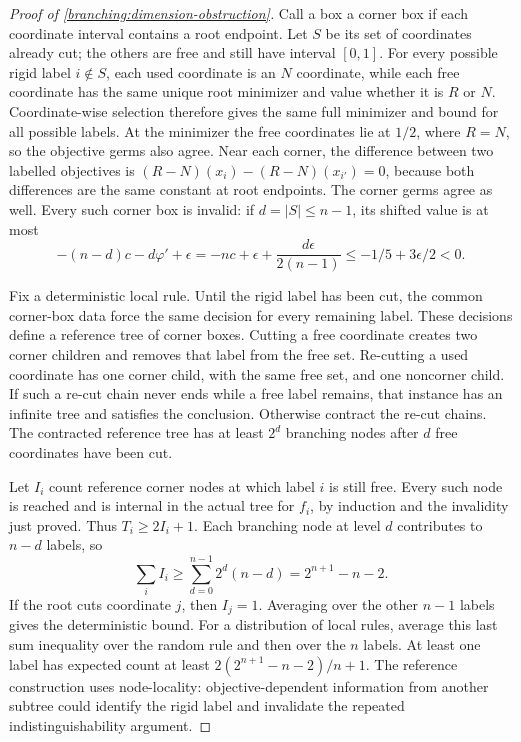 \begin{proof}[Proof of \cref{branching:dimension-obstruction}]
Call a box a corner box if each coordinate interval contains a root
endpoint. Let $S$ be its set of coordinates already cut; the others
are free and still have interval $[0,1]$. For every possible rigid
label $i\notin S$, each used coordinate is an $N$ coordinate, while
each free coordinate has the same unique root minimizer and value
whether it is $R$ or $N$. Coordinate-wise selection therefore gives
the same full minimizer and bound for all possible labels. At the
minimizer the free coordinates lie at $1/2$, where $R=N$, so the
objective germs also agree. Near each corner, the difference between
two labelled objectives is
$(R-N)(x_i)-(R-N)(x_{i'})=0$, because both differences are the same
constant at root endpoints. The corner germs agree as well.
Every such corner box is invalid: if $d=|S|\le n-1$, its shifted
value is at most
\[
 -(n-d)c-d\varphi'+\epsilon
 =-nc+\epsilon+\frac{d\epsilon}{2(n-1)}
 \le-1/5+3\epsilon/2<0.
\]

Fix a deterministic local rule. Until the rigid label has been cut,
the common corner-box data force the same decision for every remaining
label. These decisions define a reference tree of corner boxes.
Cutting a free coordinate creates two corner children and removes
that label from the free set. Re-cutting a used coordinate has one
corner child, with the same free set, and one noncorner child.
If such a re-cut chain never ends while a free label remains, that
instance has an infinite tree and satisfies the conclusion. Otherwise
contract the re-cut chains. The contracted reference tree has at least
$2^d$ branching nodes after $d$ free coordinates have been cut.

Let $I_i$ count reference corner nodes at which label $i$ is still
free. Every such node is reached and is internal in the actual tree
for $f_i$, by induction and the invalidity just proved. Thus
$T_i\ge2I_i+1$. Each branching node at level $d$ contributes to
$n-d$ labels, so
\[
 \sum_iI_i\ge\sum_{d=0}^{n-1}2^d(n-d)=2^{n+1}-n-2.
\]
If the root cuts coordinate $j$, then $I_j=1$. Averaging over the
other $n-1$ labels gives the deterministic bound.
For a distribution of local rules, average this last sum inequality
over the random rule and then over the $n$ labels. At least one label
has expected count at least $2(2^{n+1}-n-2)/n+1$.
The reference construction uses node-locality: objective-dependent
information from another subtree could identify the rigid label and
invalidate the repeated indistinguishability argument.
\end{proof}

